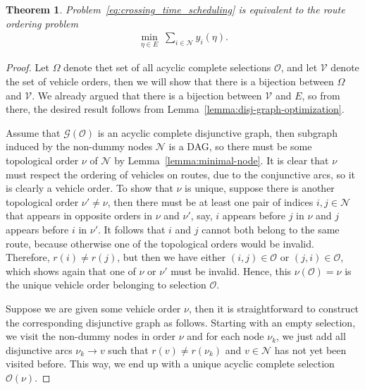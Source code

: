 \documentclass[a4paper]{report}
\theoremstyle{definition}
\theoremstyle{plain}
\newtheorem{theorem}{Theorem}[chapter]
\begin{document}
\begin{theorem}
  Problem~\eqref{eq:crossing_time_scheduling} is equivalent to the \emph{route ordering problem}
  \begin{align}
    \label{eq:RO}
    \min_{\eta \in E} \; \sum_{i \in \mathcal{N}} y_i(\eta) .
  \end{align}
\end{theorem}
\begin{proof}
  Let $\Omega$ denote thet set of all acyclic complete selections $\mathcal{O}$,
  and let $\mathcal{V}$ denote the set of vehicle orders, then we will show that there is
  a bijection between $\Omega$ and $\mathcal{V}$.
  We already argued that there is a bijection between $\mathcal{V}$ and $E$, so from
  there, the desired result follows from
  Lemma~\ref{lemma:disj-graph-optimization}.

  Assume that $\mathcal{G}(\mathcal{O})$ is an acyclic complete disjunctive graph, then
  subgraph induced by the non-dummy nodes $\mathcal{N}$ is a DAG, so there must
  be some topological order $\nu$ of $\mathcal{N}$ by
  Lemma~\ref{lemma:minimal-node}.
  It is clear that $\nu$ must respect the ordering of vehicles on routes, due to
  the conjunctive arcs, so it is clearly a vehicle order.
  To show that $\nu$ is unique, suppose there is another topological order
  $\nu' \neq \nu$, then there must be at least one pair of indices
  $i,j \in \mathcal{N}$ that appears in opposite orders in $\nu$ and $\nu'$,
  say, $i$ appears before $j$ in $\nu$ and $j$ appears before $i$ in $\nu'$. It
  follows that $i$ and $j$ cannot both belong to the same route, because
  otherwise one of the topological orders would be invalid.
  Therefore, $r(i) \neq r(j)$, but then we have either $(i,j) \in \mathcal{O}$
  or $(j,i) \in \mathcal{O}$, which shows again that one of $\nu$ or $\nu'$ must
  be invalid.
  Hence, this $\nu(\mathcal{O}) = \nu$ is the unique vehicle order belonging to
  selection $\mathcal{O}$.

  Suppose we are given some vehicle order $\nu$, then it is straightforward to
  construct the corresponding disjunctive graph as follows.
  Starting with an empty selection, we visit the non-dummy nodes in order $\nu$
  and for each node $\nu_k$, we just add all disjunctive arcs
  $\nu_k \rightarrow v$ such that $r(v) \neq r(\nu_k)$ and $v \in \mathcal{N}$
  has not yet been visited before.
  This way, we end up with a unique acyclic complete selection
  $\mathcal{O}(\nu)$.
\end{proof}
\end{document}
